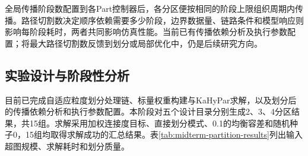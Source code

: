 全局传播阶段数配置到各Part控制器后，各分区便按相同的阶段上限组织周期内传播。路径切割数决定顺序依赖需要多少阶段，边界数据量、链路条件和模型响应则影响每阶段耗时，两者共同影响仿真性能。当前已有传播依赖分析及执行参数配置；将最大路径切割数反馈到划分或局部优化中，仍是后续研究方向。


\subsection{实验设计与阶段性分析}
\label{sec:midterm-partition-evaluation}

目前已完成自适应粒度划分处理链、标量权重构建与KaHyPar求解，以及划分后的传播依赖分析和执行参数配置。本阶段对五个设计目录分别生成2、3、4分区结果，共15组。求解采用加权连接度目标、直接划分模式、0.1的均衡容差和随机种子0，15组均取得求解成功的汇总结果。表\ref{tab:midterm-partition-results}列出输入超图规模、求解耗时和划分质量。

